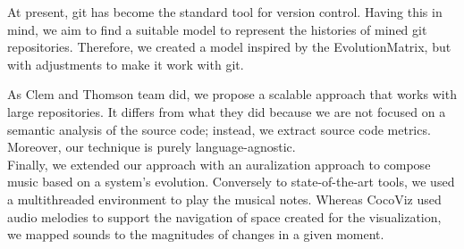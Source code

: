 At present, git has become the standard tool for version control. 
Having this in mind, we aim to find a suitable model to represent the histories of mined git repositories.
Therefore, we created a model inspired by the EvolutionMatrix, but with adjustments to make it work with git.

As Clem and Thomson \cite{Clem2021} team did, we propose a scalable approach that works with large repositories. 
It differs from what they did because we are not focused on a semantic analysis of the source code; instead, we extract source code metrics. 
Moreover, our technique is purely language-agnostic.\\

Finally, we extended our approach with an auralization approach to compose music based on a system’s evolution. 
Conversely to state-of-the-art tools, we used a multithreaded environment to play the musical notes. 
Whereas CocoViz used audio melodies to support the navigation of space created for the visualization, we mapped sounds to the magnitudes of changes in a given moment. 





